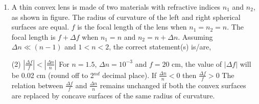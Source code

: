 \begin{enumerate}
    \item A thin convex lens is made of two materials with refractive indices \(n_1\) and \(n_2\), as shown in figure. The radius of 
curvature of the left and right spherical surfaces are equal. \(f\) is the focal length of the lens when \(n_1 = n_2 = n\). The focal length
is \(f + \Delta f\) when \(n_1 = n\) and \(n_2 = n + \Delta n\). Assuming \(\Delta n \ll (n - 1)\) and \(1 < n < 2\), the correct 
statement(s) is/are,
        \begin{tasks}(2)
            \task \(|\frac{\Delta f}{f}| < |\frac{\Delta n}{n}|\)
            \task For \(n = 1.5\), \(\Delta n = 10^{-3}\) and \(f = 20\) cm, the value of \(|\Delta f|\) will be 0.02 cm (round off to 
2\(^{nd}\) decimal place).
            \task If \(\frac{\Delta n}{n} < 0\) then \(\frac{\Delta f}{f} > 0\)
            \task The relation between \(\frac{\Delta f}{f}\) and \(\frac{\Delta n}{n}\) remains unchanged if both the convex surfaces are 
replaced by concave surfaces of the same radius of curvature.
        \end{tasks}
    \begin{center}
    \end{center}
\end{enumerate}